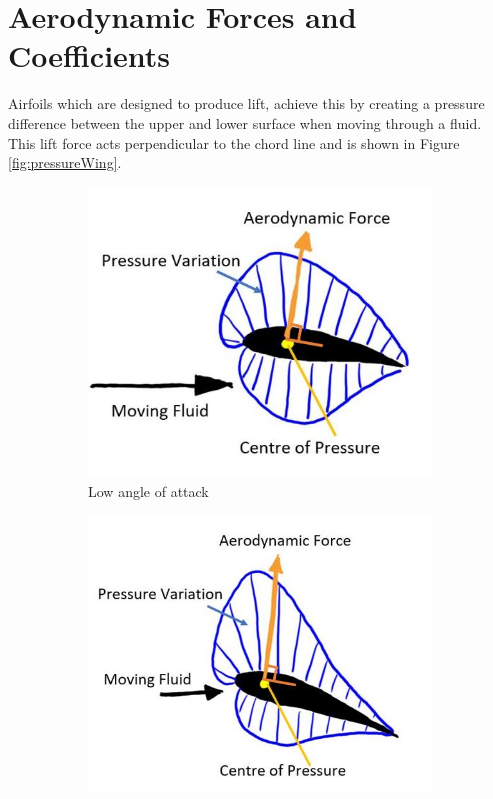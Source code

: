 \section{Aerodynamic Forces and Coefficients}
Airfoils which are designed to produce lift, achieve this by creating a  pressure difference between the upper and lower surface when moving through a fluid. This lift force acts perpendicular to the chord line and is shown in Figure \ref{fig:pressureWing}.



\begin{figure}[H]
     \centering
     \begin{subfigure}[b]{0.45\textwidth}
         \centering
         \includegraphics[width=\textwidth]{02_Background/Figs/smol.JPG}
         \caption{Low angle of attack}
         \label{fig:Press2a}
     \end{subfigure}
     \hfill
     \begin{subfigure}[b]{0.45\textwidth}
         \centering
         \includegraphics[width=\textwidth]{02_Background/Figs/big.JPG}

\end{subfigure}
\end{figure}
